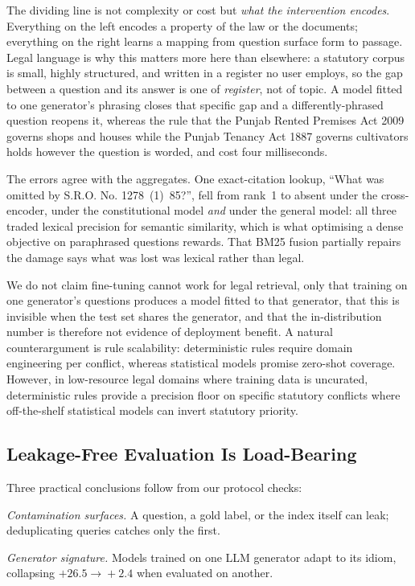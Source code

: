 \documentclass[conference]{IEEEtran}
\begin{document}
The dividing line is not complexity or cost but \emph{what the intervention
encodes}. Everything on the left encodes a property of the law or the documents;
everything on the right learns a mapping from question surface form to passage.
Legal language is why this matters more here than elsewhere: a statutory corpus
is small, highly structured, and written in a register no user employs, so the
gap between a question and its answer is one of \emph{register}, not of topic. A
model fitted to one generator's phrasing closes that specific gap and a
differently-phrased question reopens it, whereas the rule that the Punjab Rented
Premises Act 2009 governs shops and houses while the Punjab Tenancy Act 1887
governs cultivators holds however the question is worded, and cost four
milliseconds.

The errors agree with the aggregates. One exact-citation lookup, ``What was omitted by S.R.O. No. 1278~(1)~85?'', fell from rank~1 to absent
under the cross-encoder, under the constitutional model \emph{and} under the
general model: all three traded lexical precision for semantic similarity,
which is what optimising a dense objective on paraphrased questions rewards.
That BM25 fusion partially repairs the damage says what was lost was lexical
rather than legal.

We do not claim fine-tuning cannot work for legal retrieval, only that training
on one generator's questions produces a model fitted to that generator, that
this is invisible when the test set shares the generator, and that the
in-distribution number is therefore not evidence of deployment benefit. A natural
counterargument is rule scalability: deterministic rules require domain engineering
per conflict, whereas statistical models promise zero-shot coverage. However,
in low-resource legal domains where training data is uncurated, deterministic
rules provide a precision floor on specific statutory conflicts where off-the-shelf
statistical models can invert statutory priority.

\subsection{Leakage-Free Evaluation Is Load-Bearing}
\label{sec:whyleakage}
Three practical conclusions follow from our protocol checks:

\emph{Contamination surfaces.} A question, a gold label, or the index itself can
leak; deduplicating queries catches only the first.

\emph{Generator signature.} Models trained on one LLM generator adapt to its idiom,
collapsing $+26.5 \!\to\! +2.4$ when evaluated on another.
\end{document}
